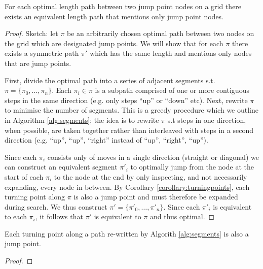 \begin{lemma}
\label{lemma:jumping}
For each optimal length path between two jump point nodes on a grid there exists
an equivalent length path that mentions only jump point nodes.
\end{lemma}
\begin{proof}
Sketch: let $\pi$ be an arbitrarily chosen optimal path between two nodes on the
grid which are designated jump points.
We will show that for each $\pi$ there exists a symmetric path $\pi'$ which has
the same length and mentions only nodes that are jump points.
\par
First, divide the optimal path into a series of adjacent
segments s.t. $\pi = \lbrace \pi_{0}, \ldots, \pi_{n} \rbrace$. Each $\pi_{i}
\in \pi$ is a subpath comprised of one or more contiguous steps in the same
direction (e.g.  only steps ``up'' or ``down'' etc).  Next, rewrite $\pi$ to
minimise the number of segments.  This is a greedy procedure which we
outline in Algorithm \ref{alg:segments}; the idea is to rewrite $\pi$ s.t steps
in one direction, when possible, are taken together rather than interleaved with
steps in a second direction (e.g. ``up'', ``up'', ``right'' instead of ``up'',
``right'', ``up'').  
\par
Since each $\pi_{i}$ consists only of moves in a single direction
(straight or diagonal) we can construct an equivalent segment $\pi'_{i}$ to optimally 
jump from the node at the start of each $\pi_{i}$ to the node at the end by only 
inspecting, and not necessarily expanding, every node in between.  
By Corollary \ref{corollary:turningpoints}, each turning point along $\pi$ is
also a jump point and must therefore be expanded during search.  
We thus construct $\pi' = \lbrace \pi'_{0}, \ldots, \pi'_{n}\rbrace$. Since each
$\pi'_{i}$ is equivalent to each $\pi_{i}$, it follows that $\pi'$ is equivalent
to $\pi$ and thus optimal.
\end{proof}

\begin{corollary}
\label{corollary:turningpoints}
Each turning point along a path re-written by Algorith \ref{alg:segments} is
also a jump point.
\end{corollary}
\begin{proof}
\end{proof}

